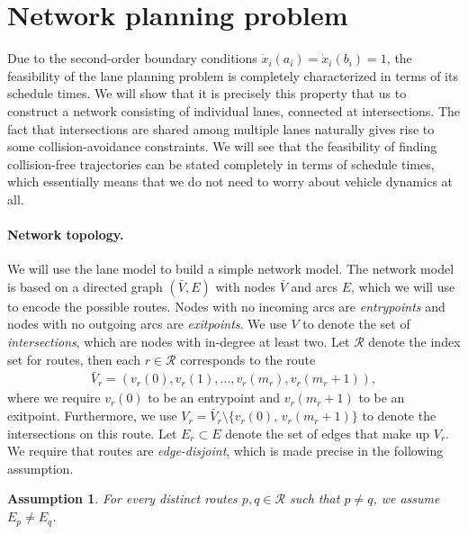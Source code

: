 \documentclass[a4paper]{article}
\theoremstyle{definition}
\theoremstyle{plain}
\newtheorem{assump}{Assumption\hspace{0.25em}\ignorespaces}
\begin{document}
\pagebreak
\section{Network planning problem}

Due to the second-order boundary conditions
$\dot{x}_{i}(a_{i}) = \dot{x}_{i}(b_{i}) = 1$, the feasibility of the lane
planning problem is completely characterized in terms of its schedule times.
%
We will show that it is precisely this property that us to construct a network
consisting of individual lanes, connected at intersections.
%
The fact that intersections are shared among multiple lanes naturally gives rise to some collision-avoidance constraints.
%
We will see that the feasibility of finding collision-free trajectories can be
stated completely in terms of schedule times, which essentially means that we do
not need to worry about vehicle dynamics at all.

\paragraph{Network topology.}

We will use the lane model to build a simple network model. The network model is
based on a directed graph $(\bar{V},E)$ with nodes $\bar{V}$ and arcs $E$, which
we will use to encode the possible routes.
%
Nodes with no incoming arcs are \textit{entrypoints} and nodes with no outgoing
arcs are \textit{exitpoints}.
%
We use $V$ to denote the set of \textit{intersections}, which are nodes with
in-degree at least two.
%
Let $\mathcal{R}$ denote the index set for routes, then each $r \in \mathcal{R}$
corresponds to the route
\begin{align*}
  \bar{V}_{r} = (v_{r}(0), v_{r}(1), \dots, v_{r}(m_{r}), v_{r}(m_{r}+1)) ,
\end{align*}
%
where we require $v_{r}(0)$ to be an entrypoint and $v_{r}(m_{r}+1)$ to be an
exitpoint. Furthermore, we use
$V_{r} = \bar{V}_{r} \setminus \{ v_{r}(0), \, v_{r}(m_{r}+1) \}$ to denote the
intersections on this route.
%
Let $E_{r} \subset E$ denote the set of edges that make up $V_{r}$.
%
We require that routes are \emph{edge-disjoint}, which is made precise in the
following assumption.

\begin{assump}\label{assump:disjoint-routes}
  For every distinct routes $p,q \in \mathcal{R}$ such that $p \neq q$, we
  assume $E_{p} \neq E_{q}$.
\end{assump}
\end{document}
